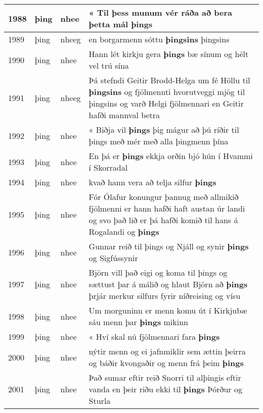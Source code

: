 \documentclass{article}
\begin{document}
\begin{longtable}{p{1cm}|p{1cm}|p{1cm}|p{13cm}}
1988&þing&nhee&« Til þess munum vér ráða að bera þetta mál \textbf{þings} \\
\hline
1989&þing&nheeg&en borgarmenn sóttu \textbf{þingsins} þingsins\\
\hline
1990&þing&nhee&Hann lét kirkju gera \textbf{þings} bæ sínum og hélt vel trú sína\\
\hline
1991&þing&nheeg&Þá stefndi Geitir Brodd-Helga um fé Höllu til \textbf{þingsins} og fjölmennti hvorutveggi mjög til þingsins og varð Helgi fjölmennari en Geitir hafði mannval betra\\
\hline
1992&þing&nhee&« Biðja vil \textbf{þings} þig mágur að þú ríðir til þings með mér með alla þingmenn þína\\
\hline
1993&þing&nhee&En þá er \textbf{þings} ekkja orðin bjó hún í Hvammi í Skorradal\\
\hline
1994&þing&nhee&kvað hann vera að telja silfur \textbf{þings} \\
\hline
1995&þing&nhee&Fór Ólafur konungur þannug með allmikið fjölmenni er hann hafði haft austan úr landi og svo það lið er þá hafði komið til hans á Rogalandi og \textbf{þings} \\
\hline
1996&þing&nhee&Gunnar reið til þings og Njáll og synir \textbf{þings} og Sigfússynir\\
\hline
1997&þing&nhee&Björn vill það eigi og koma til þings og sættust þar á málið og hlaut Björn að \textbf{þings} þrjár merkur silfurs fyrir níðreising og vísu\\
\hline
1998&þing&nhee&Um morguninn er menn komu út í Kirkjubæ sáu menn þar \textbf{þings} mikinn\\
\hline
1999&þing&nhee&« Hví skal nú fjölmennari fara \textbf{þings} \\
\hline
2000&þing&nhee&nýtir menn og ei jafnmiklir sem ættin þeirra og báðir kvongaðir og menn frá þeim \textbf{þings} \\
\hline
2001&þing&nhee&Það sumar eftir reið Snorri til alþingis eftir vanda en þeir riðu ekki til \textbf{þings} Þórður og Sturla\\
\hline
\end{longtable}
\end{document}
